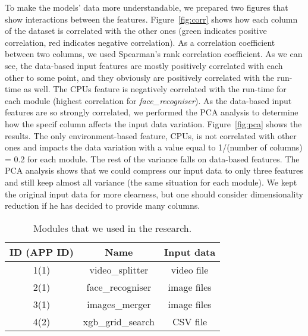To make the models' data more understandable, we prepared two figures that show interactions between the features. Figure~\ref{fig:corr} shows how each column of the dataset is correlated with the other ones (green indicates positive correlation, red indicates negative correlation). As a correlation coefficient between two columns, we used Spearman's rank correlation coefficient. As we can see, the data-based input features are mostly positively correlated with each other to some point, and they obviously are positively correlated with the run-time as well. The CPUs feature is negatively correlated with the run-time for each module (highest correlation for \textit{face\_recogniser}). As the data-based input features are so strongly correlated, we performed the PCA analysis to determine how the specif column affects the input data variation. Figure~\ref{fig:pca} shows the results.  The only environment-based feature, CPUs, is not correlated with other ones and impacts the data variation with a value equal to 1/(number of columns) = 0.2 for each module. The rest of the variance falls on data-based features. The PCA analysis shows that we could compress our input data to only three features and still keep almost all variance (the same situation for each module). We kept the original input data for more clearness, but one should consider dimensionality reduction if he has decided to provide many columns.

\begin{table}[hbt!]
	\centering
	\caption{\label{tab:modules}Modules that we used in the research.}
	\begin{tabular}{|c c c|} 
		\hline
		ID (APP ID) & Name & Input data \\ [0.5ex] 
		\hline\hline
		1(1) & video\_splitter & video file \\ 
		\hline
		2(1) & face\_recogniser & image files \\
		\hline
		3(1) & images\_merger & image files \\
		\hline
		4(2) & xgb\_grid\_search & CSV file \\
		\hline
	\end{tabular}
\end{table}
